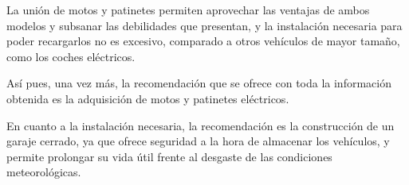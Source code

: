 La unión de motos y patinetes permiten aprovechar las ventajas de ambos modelos y subsanar las debilidades que presentan, y la instalación necesaria para poder recargarlos no es excesivo, comparado a otros vehículos de mayor tamaño, como los coches eléctricos.

Así pues, una vez más, la recomendación que se ofrece con toda la información obtenida es la adquisición de motos y patinetes eléctricos.

En cuanto a la instalación necesaria, la recomendación es la construcción de un garaje cerrado, ya que ofrece seguridad a la hora de almacenar los vehículos, y permite prolongar su vida útil frente al desgaste de las condiciones meteorológicas.

\newpage